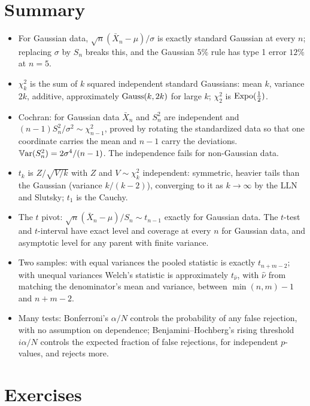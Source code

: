 \section{Summary}
\label{sec:t-summary}

\begin{itemize}[nosep]
\item For Gaussian data, $\sqrt{n}(\bar{X}_n - \mu)/\sigma$ is exactly standard Gaussian at every $n$; replacing $\sigma$ by $S_n$ breaks this, and the Gaussian $5\%$ rule has type 1 error $12\%$ at $n = 5$.
\item $\chi^2_k$ is the sum of $k$ squared independent standard Gaussians: mean $k$, variance $2k$, additive, approximately $\text{Gauss}(k, 2k)$ for large $k$; $\chi^2_2$ is $\text{Expo}(\frac12)$.
\item Cochran: for Gaussian data $\bar{X}_n$ and $S_n^2$ are independent and $(n-1)S_n^2/\sigma^2 \sim \chi^2_{n-1}$, proved by rotating the standardized data so that one coordinate carries the mean and $n - 1$ carry the deviations. $\operatorname*{\mathbb{V}\text{ar}}(S_n^2) = 2\sigma^4/(n-1)$. The independence fails for non-Gaussian data.
\item $t_k$ is $Z/\sqrt{V/k}$ with $Z$ and $V \sim \chi^2_k$ independent: symmetric, heavier tails than the Gaussian (variance $k/(k-2)$), converging to it as $k \to \infty$ by the LLN and Slutsky; $t_1$ is the Cauchy.
\item The $t$ pivot: $\sqrt{n}(\bar{X}_n - \mu)/S_n \sim t_{n-1}$ exactly for Gaussian data. The $t$-test and $t$-interval have exact level and coverage at every $n$ for Gaussian data, and asymptotic level for any parent with finite variance.
\item Two samples: with equal variances the pooled statistic is exactly $t_{n+m-2}$; with unequal variances Welch's statistic is approximately $t_{\hat{\nu}}$, with $\hat{\nu}$ from matching the denominator's mean and variance, between $\min(n,m) - 1$ and $n + m - 2$.
\item Many tests: Bonferroni's $\alpha/N$ controls the probability of any false rejection, with no assumption on dependence; Benjamini--Hochberg's rising threshold $i\alpha/N$ controls the expected fraction of false rejections, for independent $p$-values, and rejects more.
\end{itemize}

\section{Exercises}
\label{sec:t-exercises}

